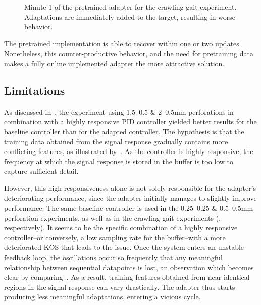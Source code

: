 \begin{figure}
    \centering
    
    \vspace*{-2em}
    \caption{Minute 1 of the pretrained adapter for the crawling gait experiment. Adaptations are immediately added to the target, resulting in worse behavior.}
    \label{fig:pre-vs-online}
\end{figure}

The pretrained implementation is able to recover within one or two updates.
Nonetheless, this counter-productive behavior, and the need for pretraining data makes a fully online implemented adapter the more attractive solution.

\subsection{Limitations}\label{subsec:limitations}
As discussed in~, the experiment using 1.5--0.5 \& 2--0.5\si{\mm} perforations in combination with a highly responsive PID controller yielded better results for the baseline controller than for the adapted controller.
The hypothesis is that the training data obtained from the signal response gradually contains more conflicting features, as illustrated by~.
As the controller is highly responsive, the frequency at which the signal response is stored in the buffer is too low to capture sufficient detail.

However, this high responsiveness alone is not solely responsible for the adapter's deteriorating performance, since the adapter initially manages to slightly improve performance.
The same baseline controller is used in the 0.25--0.25 \& 0.5--0.5\si{\mm} perforation experiments, as well as in the crawling gait experiments (, respectively).
It seems to be the specific combination of a highly responsive controller--or conversely, a low sampling rate for the buffer--with a more deteriorated KOS that leads to the issue.
Once the system enters an unstable feedback loop, the oscillations occur so frequently that any meaningful relationship between sequential datapoints is lost, an observation which becomes clear by comparing~.
As a result, training features obtained from near-identical regions in the signal response can vary drastically.
The adapter thus starts producing less meaningful adaptations, entering a vicious cycle.

